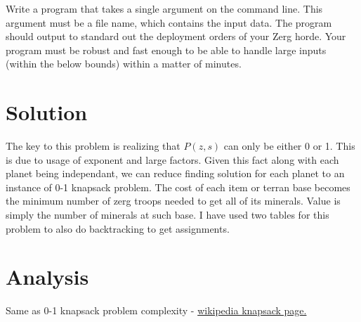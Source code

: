\documentclass[11pt]{article}
\begin{document}
Write a program that takes a single argument on the command line. This argument must be a file name, which contains the input data. The program should output to standard out the deployment orders of your Zerg horde. Your program must be robust and fast enough to be able to handle large inputs (within the below bounds) within a matter of minutes. 


\section{Solution}

The key to this problem is realizing that $ P(z,s) $ can only be either 0 or 1.  This is due to usage of exponent and large factors.  Given this fact along with each planet being independant, we can reduce finding solution for each planet to an instance of 0-1 knapsack problem.  The cost of each item or terran base becomes the minimum number of zerg troops needed to get all of its minerals.  Value is simply the number of minerals at such base.  I have used two tables for this problem to also do backtracking to get assignments.

\section{Analysis}

Same as 0-1 knapsack problem complexity - \href{http://en.wikipedia.org/wiki/Knapsack_problem#0-1_knapsack_problem}{wikipedia knapsack page.}
\end{document}
